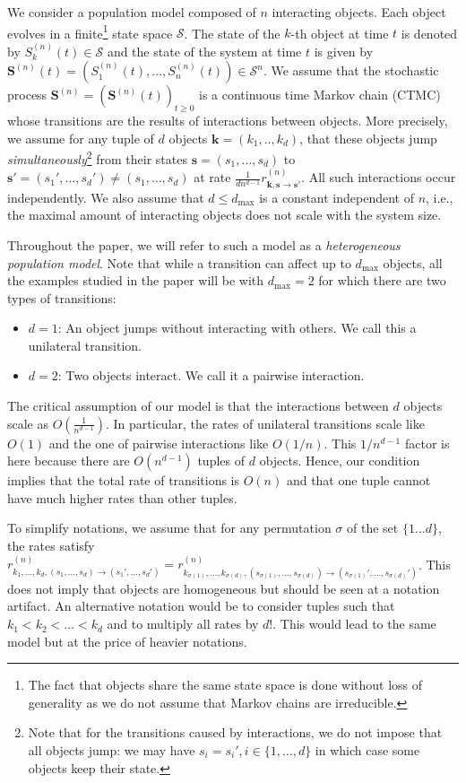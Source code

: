 \documentclass[acmsmall]{acmart}
\newcommand\bs{\mathbf{s}}
\newcommand\bk{\mathbf{k}}
\newcommand\bS{\mathbf{S}}
\newcommand\calS{\mathcal{S}}
\newcommand\toN{^{(n)}}
\newcommand\bSn{\bS\toN}
\newcommand\Sn{S\toN}
\begin{document}
We consider a population model composed of $n$ interacting objects. Each object evolves in a finite\footnote{The fact that objects share the same state space is done without loss of generality as we do not assume that Markov chains are irreducible. } state space $\calS$. The state of the $k$-th object at time $t$ is denoted by $S\toN_k(t)\in\calS$ and the state of the system at time $t$ is given by $\bSn(t)=(\Sn_1(t), \dots, \Sn_n(t))\in \calS^n$. We assume that the stochastic process $\bSn=(\bSn(t))_{t\ge0}$ is a continuous time Markov chain (CTMC) whose transitions are the results of interactions between objects. 
More precisely, we assume for any tuple of $d$ objects $\bk=(k_1,..,k_{d})$, that these objects jump \emph{simultaneously}\footnote{Note that for the transitions caused by interactions, we do not impose that all objects jump: we may have $s_i=s_i', i\in \{1,\dots,d\}$ in which case some objects keep their state.} from their states $\bs=(s_1, \dots,s_{d})$ to $\bs'=(s_1', \dots, s_{d}') \ne (s_1,\dots,s_{d})$ at rate $\frac{1}{dn^{d-1}}r_{\bk, \bs \rightarrow \bs'}\toN$. All such interactions occur independently. We also assume that $d\le d_{\max}$ is a constant independent of $n$, i.e., the maximal amount of interacting objects does not scale with the system size. 

Throughout the paper, we will refer to such a model as a \emph{heterogeneous population model}.  Note that while a transition can affect up to $d_{\max}$ objects, all the examples studied in the paper will be with $d_{\max}=2$ for which there are two types of transitions:
\begin{itemize}
  \item $d=1$: An object jumps without interacting with others. We call this a unilateral transition.
  \item $d=2$: Two objects interact. We call it a pairwise interaction. 
\end{itemize}

The critical assumption of our model is that the interactions between $d$ objects scale as $O(\frac{1}{n^{d-1}})$. In particular, the rates of unilateral transitions scale like $O(1)$ and the one of pairwise interactions like $O(1/n)$.  This $1/n^{d-1}$ factor is here because there are $O(n^{d-1})$ tuples of $d$ objects. Hence, our condition implies that the total rate of transitions is $O(n)$ and that one tuple cannot have much higher rates than other tuples.

To simplify notations, we assume that for any permutation $\sigma$ of the set $\{1\dots d\}$, the rates satisfy $r_{k_1, \dots, k_{d}, (s_1, \dots, s_{d}) \rightarrow (s_1', \dots, s_{d}')}\toN = r_{k_{\sigma(1)}, \dots, k_{\sigma(d)}, (s_{\sigma(1)}, \dots, s_{\sigma(d)}) \rightarrow (s_{\sigma(1)}', \dots, s_{\sigma(d)}')}\toN$. This does not imply that objects are homogeneous but should be seen at a notation artifact. An alternative notation would be to consider tuples such that $k_1<k_2<\dots <k_d$ and to multiply all rates by $d!$. This would lead to the same model but at the price of heavier notations.
\end{document}
